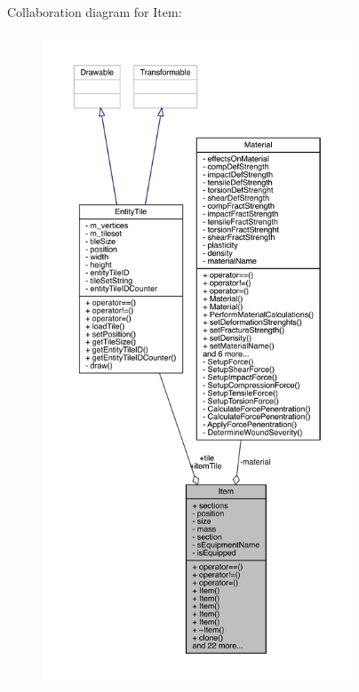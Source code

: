 Collaboration diagram for Item\+:
\nopagebreak
\begin{figure}[H]
\begin{center}
\leavevmode
\includegraphics[height=550pt]{class_item__coll__graph}
\end{center}
\end{figure}
